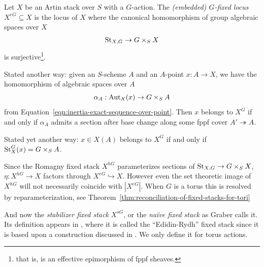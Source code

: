 \documentclass[12pt,dvipsnames]{amsart}
\begin{document}
\begin{definition}\label{rl-001C}
\cite{aranha-khan-latyntsev-etal_VirtualLocalizationRevisited2025}
  Let \(X\) be an Artin stack over \(S\) with a \(G\)-action. The \emph{(embedded) \(G\)-fixed locus} \(X^{eG}\subseteq X\) is the locus of \(X\) where the canonical homomorphism of group algebraic spaces over \(X\)
  \begin{align*}
    \operatorname{St}_{X,G}\to G \times_S X
  \end{align*}
  is surjective\footnote{that is, is an effective epimorphism of fppf sheaves.}.
\end{definition}
\begin{remark}\label{rl-001D}
  Stated another way: given an \(S\)-scheme \(A\) and an \(A\)-point \(x:A\to X\), we have the homomorphism of algebraic spaces over \(A\)
  \[\alpha_A:\operatorname{Aut}_{\mathcal X}(x) \to G\times_SA\]
  from Equation~\ref{eqn:inertia-exact-sequence-over-point}. Then \(x\) belongs to \(X^G\) if and only if \(\alpha_A\) admits a section after base change along some fppf cover \(A' \twoheadrightarrow A\).

  \bigskip
  
  \noindent Stated yet another way: \(x\in X(A)\) belongs to \(X^G\) if and only if \(\operatorname{St}^G_X(x) = G\times_S A\).
\end{remark}

Since the Romagny fixed stack $X^{hG}$ parameterizes sections of \(\operatorname{St}_{X,G} \to G\times_SX\), \(\eta:X^{hG} \to X\) factors through \(X^{eG}\hookrightarrow X\). However even the set theoretic image of \(X^{hG}\) will not necessarily coincide with \(|X^{eG}|\). When \(G\) is a torus this is resolved by reparameterization, see Theorem~\ref{thm:reconciliation-of-fixed-stacks-for-tori}


And now the \textit{stabilizer fixed stack} \(X^{sG}\), or the \textit{na\"ive fixed stack} as Graber calls it. Its definition appears in \cite{aranha-khan-latyntsev-etal_VirtualLocalizationRevisited2025}, where it is called the ``Edidin-Rydh'' fixed stack since it is based upon a construction discussed in \cite{edidin-rydh_CanonicalReductionStabilizers2021}. We only define it for torus actions.
\end{document}
